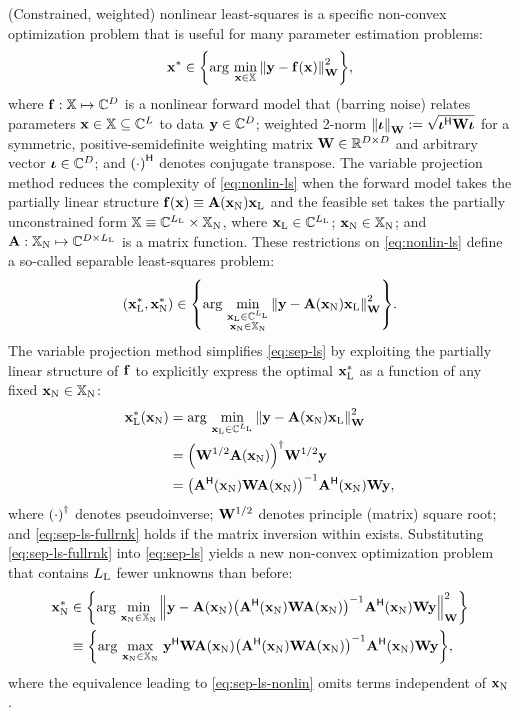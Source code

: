 (Constrained, weighted) nonlinear least-squares
is a specific non-convex optimization problem 
that is useful for many parameter estimation problems:
\begin{align}
	\bmx^* \in \set{\argmin{\bmx\in\setX} \norm{\bmy - \bmfa{\bmx}}^2_{\bmW}},
	\label{eq:nonlin-ls}
\end{align}
where $\mathbf{f} : \mathbb{X} \mapsto \mathbb{C}^{D}$ is 
a nonlinear forward model
that (barring noise) 
relates parameters 
$\mathbf{x} \in \mathbb{X} \subseteq \mathbb{C}^{L}$ 
to data $\mathbf{y} \in \mathbb{C}^{D}$;
weighted 2-norm
$\norm{\bmiota}_\bmW := \sqrt{\bmiota\ctpose\bmW\bmiota}$
for a symmetric, positive-semidefinite weighting matrix
$\mathbf{W} \in \mathbb{R}^{D\times D}$ 
and arbitrary vector $\boldsymbol{\iota} \in \mathbb{C}^{D}$;
and $\paren{\cdot}\ctpose$ denotes conjugate transpose.
The variable projection method 
\cite{golub:03:snl}
reduces the complexity of \eqref{eq:nonlin-ls}
when the forward model takes
the partially linear structure
$\bmfa{\bmx} \equiv \bmAa{\bmxn}\bmxl$
and the feasible set takes 
the partially unconstrained form 
$\mathbb{X} \equiv \mathbb{C}^{L_\mathrm{L}} \times \mathbb{X}_\mathrm{N}$,
where $\mathbf{x}_\mathrm{L} \in \mathbb{C}^{L_\mathrm{L}}$; $\mathbf{x}_\mathrm{N} \in \mathbb{X}_\mathrm{N}$;
and $\mathbf{A} : \mathbb{X}_\mathrm{N} \mapsto \mathbb{C}^{D\times L_\mathrm{L}}$ 
is a matrix function.
These restrictions on \eqref{eq:nonlin-ls} 
define a so-called separable least-squares problem:
\begin{align}
	\paren{\bmxl^*,\bmxn^*} \in 
		\set{\argmin{\substack{\bmxl \in \complexes{\Ll} \\ \bmxn \in \setXn}} 
		\norm{\bmy - \bmAa{\bmxn}\bmxl}^2_{\bmW}}.
	\label{eq:sep-ls}
\end{align}
The variable projection method simplifies \eqref{eq:sep-ls}
by exploiting the partially linear structure of $\mathbf{f}$ 
to explicitly express the optimal $\mathbf{x}_\mathrm{L}^*$ as a function 
of any fixed $\mathbf{x}_\mathrm{N} \in \mathbb{X}_\mathrm{N}$:
\begin{align}
	\bmxl^*\paren{\bmxn} 
		&= \argmin{\bmxl \in \complexes{\Ll}} 
		\norm{\bmy - \bmAa{\bmxn}\bmxl}^2_{\bmW} 
		\nonumber \\
		&= \pinv{\bmW^{1/2}\bmAa{\bmxn}} \bmW^{1/2} \bmy
		\label{eq:sep-ls-lin} \\
		&= \inv{\bmA\ctpose\paren{\bmxn} \bmW \bmAa{\bmxn}} 
		\bmA\ctpose\paren{\bmxn} \bmW \bmy,
		\label{eq:sep-ls-fullrnk}
\end{align}
where $\pinv{\cdot}$ denotes pseudoinverse;
$\mathbf{W}^{1/2}$ denotes principle (matrix) square root;
and \eqref{eq:sep-ls-fullrnk} holds
if the matrix inversion within exists.
Substituting \eqref{eq:sep-ls-fullrnk}
into \eqref{eq:sep-ls} 
yields a new non-convex optimization problem
that contains $L_\mathrm{L}$ fewer unknowns than before:
\begin{align}
	\bmxn^* &\in \set{\argmin{\bmxn\in\setXn} 
	\norm{\bmy - \bmAa{\bmxn}\inv{\bmA\ctpose\paren{\bmxn} \bmW \bmAa{\bmxn}}
		\bmA\ctpose\paren{\bmxn} \bmW \bmy}^2_{\bmW}} 
		\nonumber \\
	&\equiv \set{\argmax{\bmxn\in\setXn}
		\bmy\ctpose \bmW \bmAa{\bmxn}
		\inv{\bmA\ctpose\paren{\bmxn} \bmW \bmAa{\bmxn}}
		\bmA\ctpose\paren{\bmxn} \bmW \bmy}, 
		\label{eq:sep-ls-nonlin}
\end{align}
where the equivalence leading to \eqref{eq:sep-ls-nonlin}
omits terms independent of $\mathbf{x}_\mathrm{N}$.

